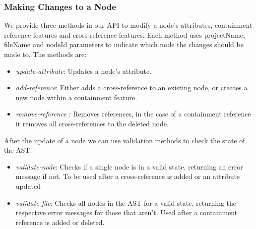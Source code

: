 \documentclass{article}
\begin{document}
{\subsubsection{Making Changes to a Node}
We provide three methods in our API to modify a node's attributes, containment reference features and cross-reference features. Each method uses projectName, fileName and nodeId parameters to indicate which node the changes should be made to. The methods are: 
\begin{itemize}
\item \emph{update-attribute}: Updates a node's attribute.
\item \emph{add-reference}: Either adds a cross-reference to an existing node, or creates a new node within a containment feature.
\item \emph{remove-reference} : Removes references, in the case of a containment reference it removes all cross-references to the deleted node.
\end{itemize} 
After the update of a node we can use validation methods to check the state of the AST:
\begin{itemize}
\item \emph{validate-node}: Checks if a single node is in a valid state, returning an error message if not. To be used after a cross-reference is added or an attribute updated
\item \emph{validate-file}: Checks all nodes in the AST for a valid state, returning the respective error messages for those that aren't. Used after a containment reference is added or deleted.
\end{itemize}

}
\end{document}
